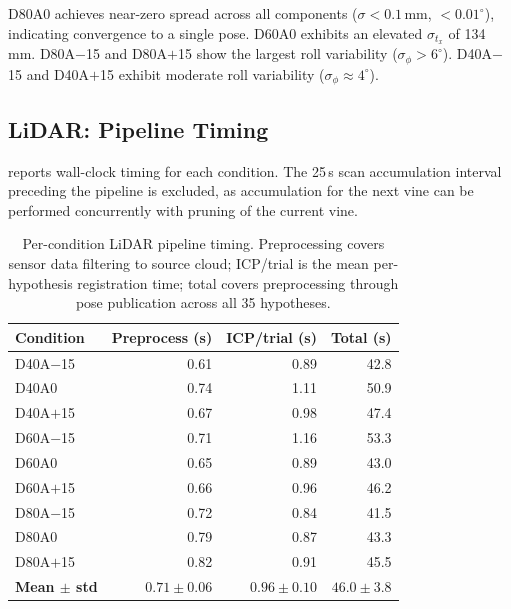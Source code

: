 D80A0 achieves near-zero spread across all components ($\sigma < 0.1$\,mm, $< 0.01^{\circ}$), indicating convergence to a single pose. D60A0 exhibits an elevated $\sigma_{t_x}$ of 134\,mm. D80A$-$15 and D80A$+$15 show the largest roll variability ($\sigma_\phi > 6^{\circ}$). D40A$-$15 and D40A$+$15 exhibit moderate roll variability ($\sigma_\phi \approx 4^{\circ}$).

\subsection{LiDAR: Pipeline Timing}
\label{subsec:pa-results-lidar-timing}

 reports wall-clock timing for each condition. The 25\,s scan accumulation interval preceding the pipeline is excluded, as accumulation for the next vine can be performed concurrently with pruning of the current vine.

\begin{table}[htbp]
  \centering
  \caption{Per-condition LiDAR pipeline timing. Preprocessing covers sensor data filtering to source cloud; ICP/trial is the mean per-hypothesis registration time; total covers preprocessing through pose publication across all 35 hypotheses.}
  \label{tab:pa-results-lidar-timing}
  \begin{tabular}{@{} l r r r @{}}
    \toprule
    \textbf{Condition} &
    \textbf{Preprocess (s)} &
    \textbf{ICP/trial (s)} &
    \textbf{Total (s)} \\
    \midrule
    D40A$-$15 & 0.61 & 0.89 & 42.8 \\
    D40A0     & 0.74 & 1.11 & 50.9 \\
    D40A$+$15 & 0.67 & 0.98 & 47.4 \\
    D60A$-$15 & 0.71 & 1.16 & 53.3 \\
    D60A0     & 0.65 & 0.89 & 43.0 \\
    D60A$+$15 & 0.66 & 0.96 & 46.2 \\
    D80A$-$15 & 0.72 & 0.84 & 41.5 \\
    D80A0     & 0.79 & 0.87 & 43.3 \\
    D80A$+$15 & 0.82 & 0.91 & 45.5 \\
    \midrule
    \textbf{Mean $\pm$ std} & $0.71 \pm 0.06$ & $0.96 \pm 0.10$ & $46.0 \pm 3.8$ \\
    \bottomrule
  \end{tabular}
\end{table}

